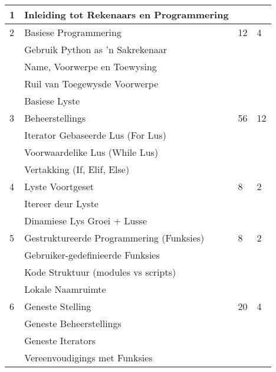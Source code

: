 \begin{longtable}{|p{1.4cm}|p{8.4cm}|p{2.2cm}|p{1.8cm}|}
             1  & Inleiding tot Rekenaars en Programmering &    &   \\
             \hline
             2  & Basiese Programmering                     & 12 & 4 \\
                & \qquad Gebruik Python as 'n Sakrekenaar   &    &   \\
                & \qquad Name, Voorwerpe en Toewysing     &    &   \\
                & \qquad Ruil van Toegewysde Voorwerpe                    &    &   \\
                & \qquad Basiese Lyste                    &    &   \\
             \hline
             3  & Beheerstellings                          & 56 & 12 \\
                & \qquad Iterator Gebaseerde Lus  (For Lus)                        &    &   \\
                & \qquad Voorwaardelike Lus  (While Lus)                        &    &   \\
                & \qquad Vertakking (If, Elif, Else)        &    &   \\                 
             \hline
             4  & Lyste Voortgeset                             & 8 & 2 \\
                & \qquad Itereer deur Lyste    &    &   \\
                & \qquad Dinamiese Lys Groei + Lusse               &    &   \\                 
             \hline
             5  & Gestruktureerde Programmering (Funksies)              & 8 & 2 \\
                & \qquad Gebruiker-gedefinieerde Funksies   &    &   \\                 
                & \qquad Kode Struktuur  (modules vs scripts)                    &    &   \\
                & \qquad Lokale Naamruimte               &    &   \\
             \hline
             6  & Geneste Stelling                     & 20 & 4 \\
                & \qquad Geneste Beheerstellings                        &    &   \\
                & \qquad Geneste Iterators                  &    &   \\
                & \qquad Vereenvoudigings met Funksies                        &    &   \\

\end{longtable}
